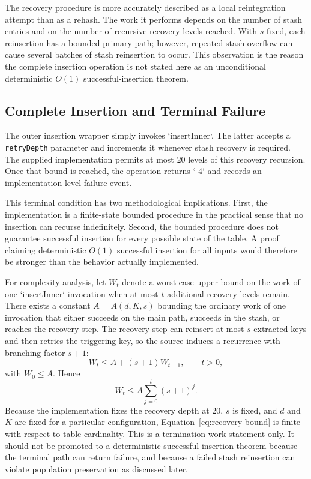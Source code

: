 \documentclass[conference]{IEEEtran}
\begin{document}
The recovery procedure is more accurately described as a local reintegration attempt than as a rehash. The work it performs depends on the number of stash entries and on the number of recursive recovery levels reached. With $s$ fixed, each reinsertion has a bounded primary path; however, repeated stash overflow can cause several batches of stash reinsertion to occur. This observation is the reason the complete insertion operation is not stated here as an unconditional deterministic $O(1)$ successful-insertion theorem.

\subsection{Complete Insertion and Terminal Failure}

The outer insertion wrapper simply invokes `insertInner`. The latter accepts a \texttt{retryDepth} parameter and increments it whenever stash recovery is required. The supplied implementation permits at most 20 levels of this recovery recursion. Once that bound is reached, the operation returns `-4` and records an implementation-level failure event.

This terminal condition has two methodological implications. First, the implementation is a finite-state bounded procedure in the practical sense that no insertion can recurse indefinitely. Second, the bounded procedure does not guarantee successful insertion for every possible state of the table. A proof claiming deterministic $O(1)$ successful insertion for all inputs would therefore be stronger than the behavior actually implemented.

For complexity analysis, let $W_t$ denote a worst-case upper bound on the work of one `insertInner` invocation when at most $t$ additional recovery levels remain. There exists a constant $A=A(d,K,s)$ bounding the ordinary work of one invocation that either succeeds on the main path, succeeds in the stash, or reaches the recovery step. The recovery step can reinsert at most $s$ extracted keys and then retries the triggering key, so the source induces a recurrence with branching factor $s+1$:
\begin{equation}
    W_t \le A + (s+1)W_{t-1},
    \qquad t>0,
    \label{eq:recovery-recurrence}
\end{equation}
with $W_0\le A$. Hence
\begin{equation}
    W_t \le A\sum_{j=0}^{t}(s+1)^j.
    \label{eq:recovery-bound}
\end{equation}
Because the implementation fixes the recovery depth at 20, $s$ is fixed, and $d$ and $K$ are fixed for a particular configuration, Equation~\eqref{eq:recovery-bound} is finite with respect to table cardinality. This is a termination-work statement only. It should not be promoted to a deterministic successful-insertion theorem because the terminal path can return failure, and because a failed stash reinsertion can violate population preservation as discussed later.
\end{document}
